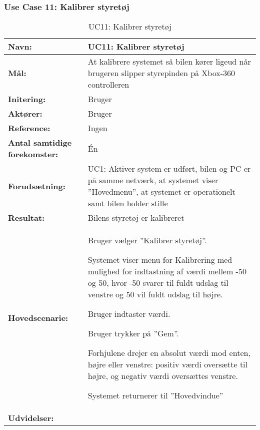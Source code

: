 \subsubsection{Use Case 11: Kalibrer styretøj}
\begin{table}[h]
\begin{tabularx}{\textwidth}{| >{\raggedright\arraybackslash}p{3.3 cm} | >{\raggedright\arraybackslash}X |} \hline

\textbf{Navn:} 						& UC11: Kalibrer styretøj												\\ \hline
\textbf{Mål:}						& At kalibrere systemet så bilen kører ligeud 
									  når brugeren slipper styrepinden på Xbox-360 controlleren 			\\ \hline
\textbf{Initering:}					& Bruger 																\\ \hline
\textbf{Aktører:} 					& Bruger																\\ \hline
\textbf{Reference:} 			    & Ingen																	\\ \hline
\textbf{Antal samtidige forekomster:} & Én 																	\\ \hline
\textbf{Forudsætning:} 				& UC1: Aktiver system er udført, bilen og PC er på samme netværk, 
									  at systemet viser ''Hovedmenu'', at systemet er operationelt 
									  samt bilen holder stille												\\ \hline
\textbf{Resultat:}					& Bilens styretøj er kalibreret 										\\ \hline
\textbf{Hovedscenarie:}				& 

\begin{packed_enum}
	\item Bruger vælger ''Kalibrer styretøj''.
	\item Systemet viser menu for Kalibrering med mulighed for indtastning af værdi mellem -50 og 50, hvor -50 svarer til fuldt udslag til venstre og 50 vil fuldt udslag til højre.
	\item Bruger indtaster værdi. 
	\item Bruger trykker på ''Gem''.
	\item Forhjulene drejer en absolut værdi mod enten, højre eller venstre: positiv værdi oversætte til højre, og negativ værdi oversættes venstre.
	\item Systemet returnerer til ''Hovedvindue''
\end{packed_enum} 																							\\ \hline
\textbf{Udvidelser:}					&  
~																				\\ \hline
\end{tabularx}
\caption{UC11: Kalibrer styretøj}
\label{tbl:UC11}
\end{table}